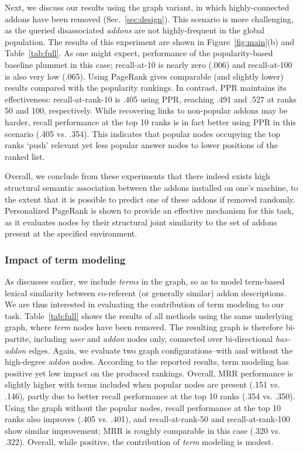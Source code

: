 \documentclass[11pt,oneside]{book}
\let\Oldsubsubsection\subsubsection
\renewcommand{\subsubsection}{\FloatBarrier\Oldsubsubsection}
\begin{document}
Next, we discuss our results using the graph variant, in which highly-connected addons have been removed (Sec.~\ref{sec:design}). This scenario is more challenging, as the queried disassociated {\it addons} are not highly-frequent in the global population. The results of this experiment are shown in Figure~\ref{fig:main}(b) and Table~\ref{tab:full}. As one might expect, performance of the popularity-based baseline plummet in this case; recall-at-10 is nearly zero (.006) and recall-at-100 is also very low (.065). Using PageRank gives comparable (and slightly lower) results compared with the popularity rankings. In contrast, PPR maintains its effectiveness: recall-at-rank-10 is .405 using PPR, reaching .491 and .527 at ranks 50 and 100, respectively. While recovering links to non-popular addons may be harder, recall performance at the top 10 ranks is in fact better using PPR in this scenario (.405 vs. .354). This indicates that popular nodes occupying the top ranks `push' relevant yet less popular answer nodes to lower positions of the ranked list.  

Overall, we conclude from these experiments that there indeed exists high structural semantic association between the addons installed on one's machine, to the extent that it is possible to predict one of these addons if removed randomly. Personalized PageRank is shown to provide an effective mechanism for this task, as it evaluates nodes by their structural joint similarity to the set of addons present at the specified environment. 

\subsubsection{Impact of term modeling}

As discusses earlier, we include {\it terms} in the graph, so as to model term-based lexical similarity between co-referent (or generally similar) addon descriptions. We are thus interested in evaluating the contribution of term modeling to our task. Table~\ref{tab:full} shows the results of all methods using the same underlying graph, where {\it term} nodes have been removed. The resulting graph is therefore bi-partite, including {\it user} and {\it addon} nodes only, connected over bi-directional {\it has-addon} edges. Again, we evaluate two graph configurations--with and without the high-degree {\it addon} nodes. According to the reported results, term modeling has positive yet low impact on the produced rankings. Overall, MRR performance is slightly higher with terms included when popular nodes are present (.151 vs. .146), partly due to better recall  performance at the top 10 ranks (.354 vs. .350). Using the graph without the popular nodes, recall performance at the top 10 ranks also improves (.405 vs. .401), and recall-at-rank-50 and recall-at-rank-100 show similar improvement; MRR is roughly comparable in this case (.320 vs. .322). Overall, while positive, the contribution of {\it term} modeling is modest. 
\end{document}
